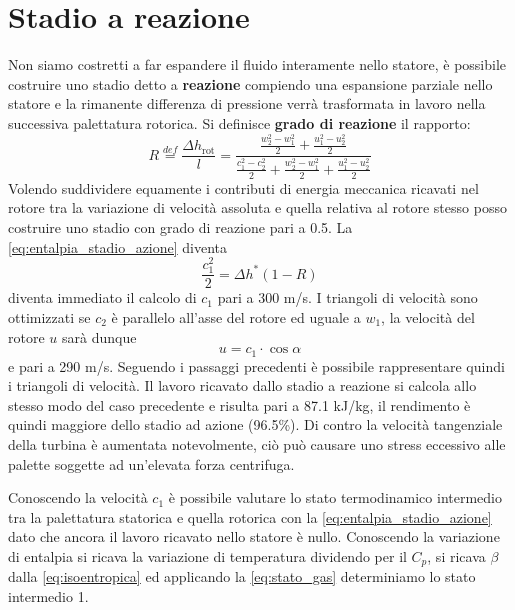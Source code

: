 \documentclass[a4paper,12pt]{article}
\begin{document}
\section{Stadio a reazione}
\label{sec:stadio_a_reazione}
Non siamo costretti a far espandere il fluido interamente nello statore, è possibile costruire uno stadio detto a \textbf{reazione} compiendo una espansione parziale
nello statore e la rimanente differenza di pressione verrà trasformata in lavoro nella successiva palettatura rotorica.
Si definisce \textbf{grado di reazione} il rapporto:
\begin{equation}
    \label{eq:grado_di_reazione}
    R \stackrel{def}{=} \frac{\Delta h_{\text{rot}}}{l} = \frac{\frac{w_2^2-w_1^2}{2} + \frac{u_1^2 - u_2^2}{2} }  %
                                                                {\frac{c_1^2-c_2^2}{2} + \frac{w_2^2-w_1^2}{2} + \frac{u_1^2 - u_2^2}{2}}  %
\end{equation}
Volendo suddividere equamente i contributi di energia meccanica ricavati nel rotore tra la variazione di velocità assoluta e quella relativa al rotore stesso
posso costruire uno stadio con grado di reazione pari a 0.5.
La \eqref{eq:entalpia_stadio_azione} diventa
\begin{equation}
    \frac{c_1^2}{2} = \Delta h^* (1-R)
\end{equation}
diventa immediato il calcolo di $c_1$ pari a 300 m/s.
I triangoli di velocità sono ottimizzati se $c_2$ è parallelo all'asse del rotore ed uguale a $w_1$, la velocità del rotore $u$ sarà dunque
\begin{equation}
    u = c_1 \cdot \cos \alpha
\end{equation}
e pari a 290 m/s.
Seguendo i passaggi precedenti è possibile rappresentare quindi i triangoli di velocità.
Il lavoro ricavato dallo stadio a reazione si calcola allo stesso modo del caso precedente e risulta pari a 87.1 kJ/kg, il rendimento è quindi maggiore dello stadio
ad azione (96.5\%). Di contro la velocità tangenziale della turbina è aumentata notevolmente, ciò può causare uno stress eccessivo alle palette soggette ad un'elevata
forza centrifuga.

Conoscendo la velocità $c_1$ è possibile valutare lo stato termodinamico intermedio tra la palettatura statorica e quella rotorica con la \eqref{eq:entalpia_stadio_azione}
dato che ancora il lavoro ricavato nello statore è nullo.
Conoscendo la variazione di entalpia si ricava la variazione di temperatura dividendo per il $C_p$, si ricava $\beta$ dalla \eqref{eq:isoentropica}
ed applicando la \eqref{eq:stato_gas} determiniamo lo stato intermedio 1.
\end{document}
